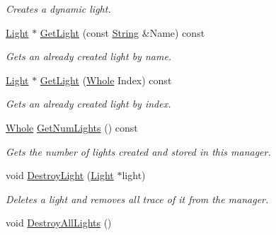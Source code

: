 \begin{DoxyCompactItemize}
\begin{DoxyCompactList}\small\item\em Creates a dynamic light. \item\end{DoxyCompactList}\item 
\hyperlink{classphys_1_1Light}{Light} $\ast$ \hyperlink{classphys_1_1SceneManager_a00849466a4248d71f7e1ecfd5a07a89c}{GetLight} (const \hyperlink{namespacephys_aa03900411993de7fbfec4789bc1d392e}{String} \&Name) const 
\begin{DoxyCompactList}\small\item\em Gets an already created light by name. \item\end{DoxyCompactList}\item 
\hyperlink{classphys_1_1Light}{Light} $\ast$ \hyperlink{classphys_1_1SceneManager_a3c5aaeb80eed8032d6f9417073d2be8b}{GetLight} (\hyperlink{namespacephys_a460f6bc24c8dd347b05e0366ae34f34a}{Whole} Index) const 
\begin{DoxyCompactList}\small\item\em Gets an already created light by index. \item\end{DoxyCompactList}\item 
\hyperlink{namespacephys_a460f6bc24c8dd347b05e0366ae34f34a}{Whole} \hyperlink{classphys_1_1SceneManager_aa1eaa692e63a6d8e328d2f0e4a2f9bf8}{GetNumLights} () const 
\begin{DoxyCompactList}\small\item\em Gets the number of lights created and stored in this manager. \item\end{DoxyCompactList}\item 
void \hyperlink{classphys_1_1SceneManager_a0f6ebec4e8a372b0fcc2b2205bac7725}{DestroyLight} (\hyperlink{classphys_1_1Light}{Light} $\ast$light)
\begin{DoxyCompactList}\small\item\em Deletes a light and removes all trace of it from the manager. \item\end{DoxyCompactList}\item 
\hypertarget{classphys_1_1SceneManager_a6246fbc7c12300416dfc99bdbb22d002}{
void \hyperlink{classphys_1_1SceneManager_a6246fbc7c12300416dfc99bdbb22d002}{DestroyAllLights} ()}
\label{classphys_1_1SceneManager_a6246fbc7c12300416dfc99bdbb22d002}


\end{DoxyCompactItemize}
